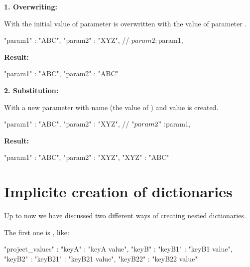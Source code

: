\vspace{2ex}

\textbf{1. Overwriting:}

With  the initial value  of parameter  is overwritten with the value 
of parameter .

\begin{pythoncode}
{
   "param1"  : "ABC",
   "param2"  : "XYZ",
   //
   ${param2} : ${param1},
}
\end{pythoncode}

\vspace{2ex}

\textbf{Result:}

\begin{pythonlog}
{"param1" : "ABC",
 "param2" : "ABC"}
\end{pythonlog}

\vspace{2ex}

\textbf{2. Substitution:}

With  a new parameter with name  (the value of ) and value 
is created.

\begin{pythoncode}
{
   "param1"    : "ABC",
   "param2"    : "XYZ",
   //
   "${param2}" : ${param1},
}
\end{pythoncode}

\vspace{2ex}

\textbf{Result:}

\begin{pythonlog}
{"param1" : "ABC",
 "param2" : "XYZ",
 "XYZ" : "ABC"}
\end{pythonlog}


\newpage

\section{Implicite creation of dictionaries}

Up to now we have discussed two different ways of creating nested dictionaries.

The first one is , like:

\begin{pythoncode}
{
   "project_values" : {"keyA" : "keyA value",
                       "keyB" : {"keyB1" : "keyB1 value",
                                 "keyB2" : {"keyB21" : "keyB21 value",
                                            "keyB22" : "keyB22 value"}}}
}
\end{pythoncode}

